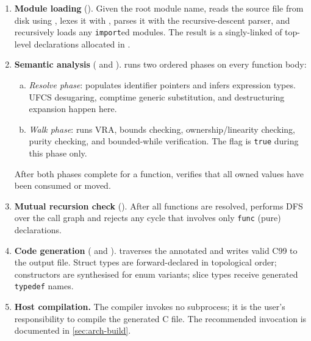 \begin{enumerate}
\item \textbf{Module loading} ().  Given the root module name,
   reads the source file from disk using ,
  lexes it with , parses it with the recursive-descent parser,
  and recursively loads any \texttt{import}ed modules.  The result is a singly-linked
   of top-level declarations allocated in .

\item \textbf{Semantic analysis} ( and ).
   runs two ordered phases on every function body:
  \begin{enumerate}[(a)]
  \item \textit{Resolve phase}:  populates identifier
     pointers and infers expression types.  UFCS desugaring,
    comptime generic substitution, and destructuring expansion happen here.
  \item \textit{Walk phase}:  runs VRA, bounds checking,
    ownership/linearity checking, purity checking, and bounded-while verification.
    The flag  is \texttt{true} during this phase only.
  \end{enumerate}
  After both phases complete for a function, 
  verifies that all owned values have been consumed or moved.

\item \textbf{Mutual recursion check} ().
  After all functions are resolved, 
  performs DFS over the call graph and rejects any cycle that involves only
  \texttt{func} (pure) declarations.

\item \textbf{Code generation} ( and ).
   traverses the annotated  and writes valid C99 to
  the output file.  Struct types are forward-declared in topological order;
  constructors are synthesised for enum variants; slice types receive generated
  \texttt{typedef} names.

\item \textbf{Host compilation.}  The compiler invokes no subprocess; it is the
  user's responsibility to compile the generated C file.  The recommended invocation
  is documented in \cref{sec:arch-build}.
\end{enumerate}

